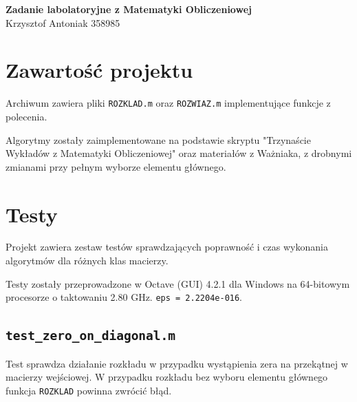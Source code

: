 \documentclass{article}
\begin{document}
\lstset{basicstyle=\ttfamily\footnotesize, breaklines=true}
 
\begin{center}
  \Huge
  \textbf{Zadanie labolatoryjne z Matematyki Obliczeniowej} \\[0.5cm]
  
  \large
  Krzysztof Antoniak 358985
\end{center}

\section{Zawartość projektu}
Archiwum zawiera pliki \verb|ROZKLAD.m| oraz \verb|ROZWIAZ.m| implementujące funkcje z polecenia.




Algorytmy zostały zaimplementowane na podstawie skryptu "Trzynaście Wykładów z Matematyki Obliczeniowej" oraz materiałów z Ważniaka, z drobnymi zmianami przy pełnym wyborze elementu głównego.

\section{Testy}
Projekt zawiera zestaw testów sprawdzających poprawność i czas wykonania algorytmów dla różnych klas macierzy.

Testy zostały przeprowadzone w Octave (GUI) 4.2.1 dla Windows na 64-bitowym procesorze o taktowaniu 2.80 GHz. \texttt{eps = 2.2204e-016}.

\subsection{\texttt{test\_zero\_on\_diagonal.m}}
Test sprawdza działanie rozkładu w przypadku wystąpienia zera na przekątnej w macierzy wejściowej. W przypadku rozkładu bez wyboru elementu głównego funkcja \verb|ROZKLAD| powinna zwrócić błąd.

\end{document}
